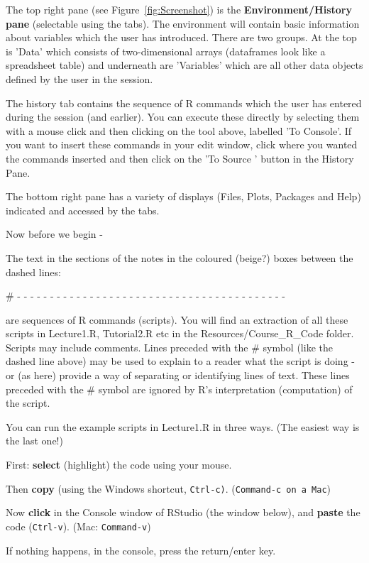\documentclass[titlepage]{book}
\begin{document}
The top right pane (see Figure~\ref{fig:Screenshot}) is the \textbf{Environment/History pane} (selectable using the tabs). The environment will contain basic information about variables which the user has introduced. There are two groups. At the top is 'Data' which consists of two-dimensional arrays (dataframes look like a spreadsheet table) and underneath are 'Variables' which are all other data objects defined by the user in the session.

The history tab contains the sequence of R commands which the user has entered during the session (and earlier). You can execute these directly by selecting them with a mouse click and then clicking on the tool above, labelled 'To Console'. If you want to insert these commands in your edit window, click where you wanted the commands inserted and then click on the 'To Source ' button in the History Pane.


The bottom right pane has a variety of displays (Files, Plots, Packages and Help) indicated and accessed by the tabs.

Now before we begin -

The text in the sections of the notes in the coloured (beige?) boxes between the dashed lines:

\# - - - - - - - - - - - - - - - - - - - - - - - - - - - - - - - - - - - - - - - - -

are sequences of R commands (scripts). You will find an extraction of all these scripts in Lecture1.R, Tutorial2.R etc in the Resources/Course\_R\_Code folder.
Scripts may include comments. Lines preceded with the \# symbol (like the dashed line above) may be used to explain to a reader what the script is doing - or (as here) provide a way of separating or identifying lines of text. These lines preceded with the \# symbol are ignored by R's interpretation (computation) of the script.

You can run the example scripts in Lecture1.R in three ways.
(The easiest way is the last one!)

First: \textbf{select} (highlight) the code using your mouse.

Then \textbf{copy} (using the Windows shortcut, \texttt{Ctrl-c)}. (\texttt{Command-c on a Mac})

Now \textbf{click} in the Console window of RStudio (the window below), and \textbf{paste} the code (\texttt{Ctrl-v}). (Mac: \texttt{Command-v})

If nothing happens, in the console, press the return/enter key.
\end{document}
